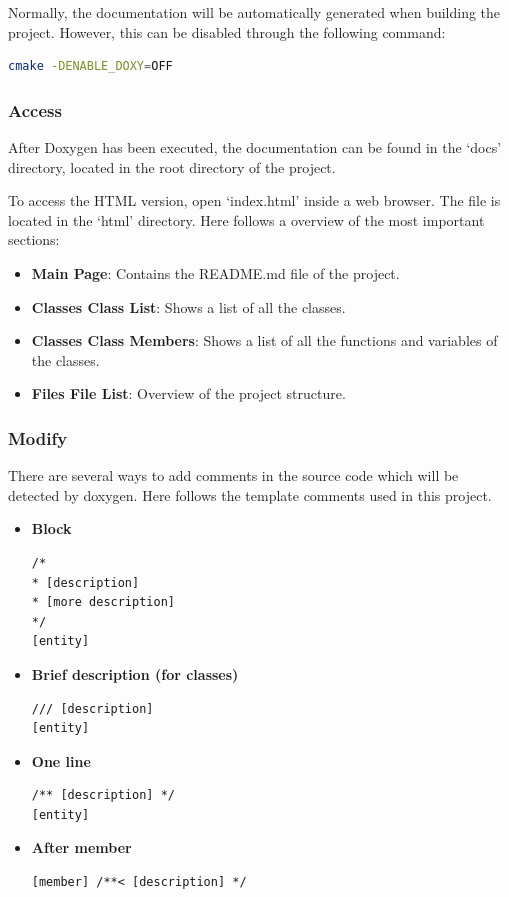 \documentclass[]{article}
\begin{document}
Normally, the documentation will be automatically generated when building the project. However, this can be disabled through the following command:
\begin{lstlisting}[language=bash]
cmake -DENABLE_DOXY=OFF
\end{lstlisting}

\subsubsection{Access}
After Doxygen has been executed, the documentation can be found in the ‘docs’ directory, located in the root directory of the project.

To access the HTML version, open ‘index.html’ inside a web browser. The file is located in the ‘html’ directory. Here follows a overview of the most important sections:
\begin{itemize}
	\itemsep 0em
	\item \textbf{Main Page}: Contains the README.md file of the project.
	\item \textbf{Classes \textrangle{} Class List}: Shows a list of all the classes.
	\item \textbf{Classes \textrangle{} Class Members}: Shows a list of all the functions and variables of the classes.
	\item \textbf{Files \textrangle{} File List}: Overview of the project structure.
\end{itemize}

\subsubsection{Modify}
There are several ways to add comments in the source code which will be detected by doxygen. Here follows the template comments used in this project.
\begin{itemize}
\item \textbf{Block}
\begin{lstlisting}
/*
* [description]
* [more description]
*/
[entity]
\end{lstlisting}

\item \textbf{Brief description (for classes)}
\begin{lstlisting}
/// [description]
[entity]
\end{lstlisting}

\item \textbf{One line}
\begin{lstlisting}
/** [description] */
[entity]
\end{lstlisting}

\item \textbf{After member}
\begin{lstlisting}
[member] /**< [description] */
\end{lstlisting}

\end{itemize}
\end{document}
